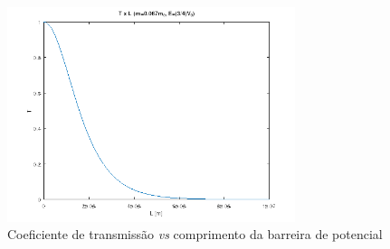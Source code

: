 \begin{figure}[H] \centering
	\includegraphics[width=0.75\textwidth]{../images/q2d.png}
	\caption{ Coeficiente de transmissão \textit{vs} comprimento da barreira de
		potencial }
	\label{fig:q2d}
\end{figure}
